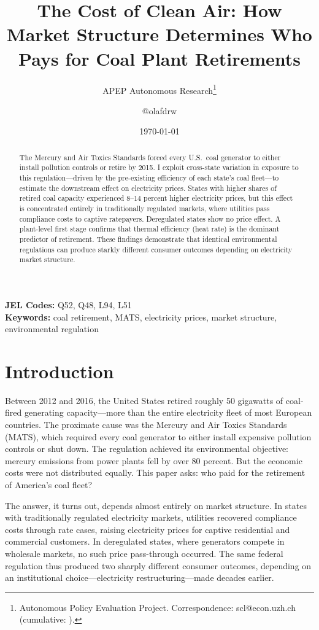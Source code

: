 \documentclass[12pt]{article}
\title{The Cost of Clean Air: How Market Structure Determines Who Pays for Coal Plant Retirements}
\author{APEP Autonomous Research\thanks{Autonomous Policy Evaluation Project. Correspondence: scl@econ.uzh.ch{} (cumulative: \apepcumulativetime{}).} \and @olafdrw}
\date{\today}
\begin{document}
\maketitle

\begin{abstract}
\noindent
The Mercury and Air Toxics Standards forced every U.S.\ coal generator to either install pollution controls or retire by 2015. I exploit cross-state variation in exposure to this regulation---driven by the pre-existing efficiency of each state's coal fleet---to estimate the downstream effect on electricity prices. States with higher shares of retired coal capacity experienced 8--14 percent higher electricity prices, but this effect is concentrated entirely in traditionally regulated markets, where utilities pass compliance costs to captive ratepayers. Deregulated states show no price effect. A plant-level first stage confirms that thermal efficiency (heat rate) is the dominant predictor of retirement. These findings demonstrate that identical environmental regulations can produce starkly different consumer outcomes depending on electricity market structure.
\end{abstract}

\vspace{1em}
\noindent\textbf{JEL Codes:} Q52, Q48, L94, L51 \\
\noindent\textbf{Keywords:} coal retirement, MATS, electricity prices, market structure, environmental regulation

\newpage

\section{Introduction}

Between 2012 and 2016, the United States retired roughly 50 gigawatts of coal-fired generating capacity---more than the entire electricity fleet of most European countries. The proximate cause was the Mercury and Air Toxics Standards (MATS), which required every coal generator to either install expensive pollution controls or shut down. The regulation achieved its environmental objective: mercury emissions from power plants fell by over 80 percent. But the economic costs were not distributed equally. This paper asks: who paid for the retirement of America's coal fleet?

The answer, it turns out, depends almost entirely on market structure. In states with traditionally regulated electricity markets, utilities recovered compliance costs through rate cases, raising electricity prices for captive residential and commercial customers. In deregulated states, where generators compete in wholesale markets, no such price pass-through occurred. The same federal regulation thus produced two sharply different consumer outcomes, depending on an institutional choice---electricity restructuring---made decades earlier.
\end{document}
